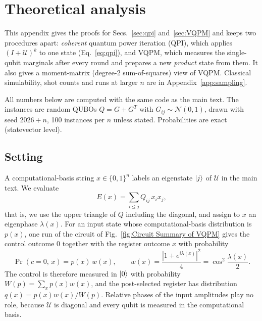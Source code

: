 
\section{Theoretical analysis}
\setcounter{equation}{0}
\renewcommand{\theequation}{\thesection\arabic{equation}}
\label{app:theory}

This appendix gives the proofs for Secs.~\ref{sec:qpi} and~\ref{sec:VQPM} and keeps two procedures apart: \emph{coherent} quantum power iteration (QPI), which applies $(I+\mathcal{U})^k$ to one state (Eq.~\ref{eq:qpi}), and VQPM, which measures the single-qubit marginals after every round and prepares a new \emph{product} state from them. It also gives a moment-matrix (degree-2 sum-of-squares) view of VQPM. Classical simulability, shot counts and runs at larger $n$ are in Appendix~\ref{app:sampling}.

All numbers below are computed with the same code as the main text. The instances are random QUBOs $Q=G+G^T$ with $G_{ij}\sim\mathcal N(0,1)$, drawn with seed $2026+n$, 100 instances per $n$ unless stated. Probabilities are exact (statevector level).

\subsection{Setting}
\label{app:setting}
A computational-basis string $x\in\{0,1\}^n$ labels an eigenstate $\left|j\right\rangle$ of $\mathcal{U}$ in the main text. We evaluate
\begin{equation}
E(x)=\sum_{i\le j}Q_{ij}\,x_ix_j ,
\label{eq:app-energy}
\end{equation}
that is, we use the upper triangle of $Q$ including the diagonal, and assign to $x$ an eigenphase $\lambda(x)$. For an input state whose computational-basis distribution is $p(x)$, one run of the circuit of Fig.~\ref{fig:Circuit Summary of VQPM} gives the control outcome $0$ together with the register outcome $x$ with probability
\begin{equation}
\Pr(c=0,\,x)=p(x)\,w(x),\qquad w(x)=\frac{|1+e^{i\lambda(x)}|^2}{4}=\cos^2\!\frac{\lambda(x)}{2}.
\label{eq:app-filter}
\end{equation}
The control is therefore measured in $\left|0\right\rangle$ with probability $W(p)=\sum_x p(x)w(x)$, and the post-selected register has distribution $q(x)=p(x)w(x)/W(p)$. Relative phases of the input amplitudes play no role, because $\mathcal{U}$ is diagonal and every qubit is measured in the computational basis.

